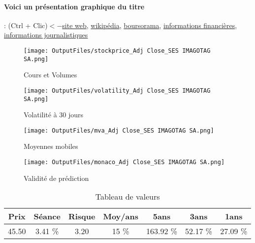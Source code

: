 \documentclass[11pt,a4paper]{report}%
\begin{document}
\paragraph{Voici un présentation graphique du titre} : (Ctrl + Clic)$<-$\href{https://www.ses-imagotag.com/fr/}{site web}, \href{https://fr.wikipedia.org/wiki/SES-imagotag}{wikipédia}, \href{https://www.boursorama.com/cours/1rPSESL}{boursorama}, \href{https://www.qwant.com/?q=site:https:%2f%2fwww.easybourse.com%2faction-societe%2fSES-IMAGOTAG-SA&t=web&client=ext-firefox-hp}{informations financières}, \href{https://bourse.lerevenu.com/cours-de-bourse/fiche-valeur-synthese/SES-IMAGOTAG-SA/SESL-FR}{informations journalistiques}
\begin{figure}[!htb]
   \begin{minipage}{0.5\textwidth}
     \centering
     \texttt{[image: OutputFiles/stockprice\_Adj Close\_SES IMAGOTAG SA.png]}
     \caption{Cours et Volumes}\label{Fig:price_SES IMAGOTAG SA}
   \end{minipage}\hfill
   \begin{minipage}{0.5\textwidth}
     \centering
     \texttt{[image: OutputFiles/volatility\_Adj Close\_SES IMAGOTAG SA.png]}
     \caption{Volatilité à 30 jours}\label{Fig:volat_SES IMAGOTAG SA}
   \end{minipage}
\end{figure}
\begin{figure}[!htb]
   \begin{minipage}{0.5\textwidth}
     \centering
     \texttt{[image: OutputFiles/mva\_Adj Close\_SES IMAGOTAG SA.png]}
     \caption{Moyennes mobiles}\label{Fig:mva_SES IMAGOTAG SA}
   \end{minipage}\hfill
   \begin{minipage}{0.5\textwidth}
     \centering
     \texttt{[image: OutputFiles/monaco\_Adj Close\_SES IMAGOTAG SA.png]}
     \caption{Validité de prédiction}\label{Fig:prediction_SES IMAGOTAG SA}
   \end{minipage}
\end{figure}

\begin{table}[H]
  \centering
    \begin{tabular}{|c|c|c|c|c|c|c|}
    \hline
    Prix & Séance & Risque  & Moy/ans & 5ans & 3ans & 1ans \\
    \hline
    45.50 &    3.41 \%    & 3.20 & 15 \% & 163.92 \% & 52.17 \% & 27.09 \% \\
    \hline
    \end{tabular}%
        \label{tab:table_SES IMAGOTAG SA}%
      \caption{Tableau de valeurs}
\end{table}%
\end{document}
